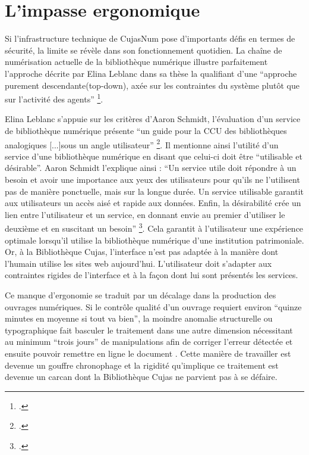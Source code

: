 \section{L'impasse ergonomique}
Si l'infrastructure technique de CujasNum pose d'importants défis en termes de sécurité, la limite se révèle dans son fonctionnement quotidien. La chaîne de numérisation actuelle de la bibliothèque numérique illustre parfaitement l'approche décrite par Elina Leblanc dans sa thèse la qualifiant d'une \enquote{approche purement descendante(top-down), axée sur les contraintes du système plutôt que sur l'activité des agents} \footcite{leblancBibliothequesNumeriquesEnrichies}.

Elina Leblanc s'appuie sur les critères d'Aaron Schmidt, l'évaluation d'un service de bibliothèque numérique présente \enquote{un guide pour la CCU des bibliothèques analogiques [...]sous un angle utilisateur} \footcite{leblancBibliothequesNumeriquesEnrichies}. Il mentionne ainsi l'utilité d'un service d'une bibliothèque numérique en disant que celui-ci doit être \enquote{utilisable et désirable}. Aaron Schmidt l'explique ainsi : \enquote{Un service utile doit répondre à un besoin et avoir une importance aux yeux des utilisateurs pour qu'ils ne l'utilisent pas de manière ponctuelle, mais sur la longue durée. Un service utilisable garantit aux utilisateurs un accès aisé et rapide aux données. Enfin, la désirabilité crée un lien entre l'utilisateur et un service, en donnant envie au premier d'utiliser le deuxième et en suscitant un besoin} \footcite{leblancBibliothequesNumeriquesEnrichies}. Cela garantit à l'utilisateur une expérience optimale lorsqu'il utilise la bibliothèque numérique d'une institution patrimoniale. Or, à la Bibliothèque Cujas, l'interface n'est pas adaptée à la manière dont l'humain utilise les sites web aujourd'hui. L'utilisateur doit s'adapter aux contraintes rigides de l'interface et à la façon dont lui sont présentés les services. 

Ce manque d'ergonomie se traduit par un décalage dans la production des ouvrages numériques. Si le contrôle qualité d'un ouvrage requiert environ \enquote{quinze minutes en moyenne si tout va bien}, la moindre anomalie structurelle ou typographique fait basculer le traitement dans une autre dimension nécessitant au minimum \enquote{trois jours} de manipulations afin de corriger l'erreur détectée et ensuite pouvoir remettre en ligne le document . Cette manière de travailler est devenue un gouffre chronophage et la rigidité qu'implique ce traitement est devenue un carcan dont la Bibliothèque Cujas ne parvient pas à se défaire.

